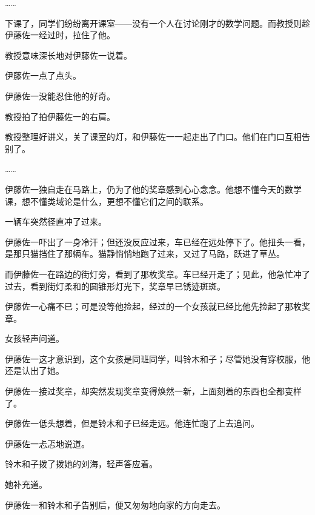 ……

下课了，同学们纷纷离开课室——没有一个人在讨论刚才的数学问题。而教授则趁伊藤佐一经过时，拉住了他。

教授意味深长地对伊藤佐一说着。

伊藤佐一点了点头。

伊藤佐一没能忍住他的好奇。

教授拍了拍伊藤佐一的右肩。

教授整理好讲义，关了课室的灯，和伊藤佐一一起走出了门口。他们在门口互相告别了。

……

伊藤佐一独自走在马路上，仍为了他的奖章感到心心念念。他想不懂今天的数学课，想不懂类域论是什么，更想不懂它们之间的联系。

一辆车突然径直冲了过来。

伊藤佐一吓出了一身冷汗；但还没反应过来，车已经在远处停下了。他扭头一看，是那只猫挡住了那辆车。猫静悄悄地跑了过来，又过了马路，跃进了草丛。

而伊藤佐一在路边的街灯旁，看到了那枚奖章。车已经开走了；见此，他急忙冲了过去，看到街灯柔和的圆锥形灯光下，奖章早已锈迹斑斑。

伊藤佐一心痛不已；可是没等他捡起，经过的一个女孩就已经比他先捡起了那枚奖章。

女孩轻声问道。

伊藤佐一这才意识到，这个女孩是同班同学，叫铃木和子；尽管她没有穿校服，他还是认出了她。

伊藤佐一接过奖章，却突然发现奖章变得焕然一新，上面刻着的东西也全都变样了。


伊藤佐一低头想着，但是铃木和子已经走远。他连忙跑了上去追问。

伊藤佐一忐忑地说道。

铃木和子拨了拨她的刘海，轻声答应着。

她补充道。

伊藤佐一和铃木和子告别后，便又匆匆地向家的方向走去。



